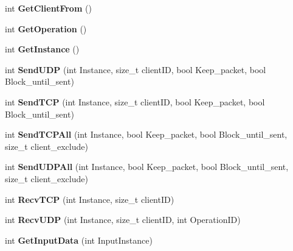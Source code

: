 \begin{DoxyCompactItemize}
\item 
\hypertarget{classcl_packet_ad8a08265ce5cf09f0228070be21f8744}{
int {\bfseries GetClientFrom} ()}
\label{classcl_packet_ad8a08265ce5cf09f0228070be21f8744}

\item 
\hypertarget{classcl_packet_a50a7c898447b5a5ca8bc14be17bae29f}{
int {\bfseries GetOperation} ()}
\label{classcl_packet_a50a7c898447b5a5ca8bc14be17bae29f}

\item 
\hypertarget{classcl_packet_a4d0d2655dc0739e54f983d9ecf58a874}{
int {\bfseries GetInstance} ()}
\label{classcl_packet_a4d0d2655dc0739e54f983d9ecf58a874}

\item 
\hypertarget{classcl_packet_a64034d51f45edee64c63805557440548}{
int {\bfseries SendUDP} (int Instance, size\_\-t clientID, bool Keep\_\-packet, bool Block\_\-until\_\-sent)}
\label{classcl_packet_a64034d51f45edee64c63805557440548}

\item 
\hypertarget{classcl_packet_ab41318551bd4bd28c51defd2c2616e62}{
int {\bfseries SendTCP} (int Instance, size\_\-t clientID, bool Keep\_\-packet, bool Block\_\-until\_\-sent)}
\label{classcl_packet_ab41318551bd4bd28c51defd2c2616e62}

\item 
\hypertarget{classcl_packet_ac30e73d8faa13087eaff1f864be1eb95}{
int {\bfseries SendTCPAll} (int Instance, bool Keep\_\-packet, bool Block\_\-until\_\-sent, size\_\-t client\_\-exclude)}
\label{classcl_packet_ac30e73d8faa13087eaff1f864be1eb95}

\item 
\hypertarget{classcl_packet_a866ff31b2a8185ae389721a3ab8ba9fc}{
int {\bfseries SendUDPAll} (int Instance, bool Keep\_\-packet, bool Block\_\-until\_\-sent, size\_\-t client\_\-exclude)}
\label{classcl_packet_a866ff31b2a8185ae389721a3ab8ba9fc}

\item 
\hypertarget{classcl_packet_a0f5a7d5a1da1917608ace018b815af81}{
int {\bfseries RecvTCP} (int Instance, size\_\-t clientID)}
\label{classcl_packet_a0f5a7d5a1da1917608ace018b815af81}

\item 
\hypertarget{classcl_packet_a7ba9cba116945bb89e51041275a93796}{
int {\bfseries RecvUDP} (int Instance, size\_\-t clientID, int OperationID)}
\label{classcl_packet_a7ba9cba116945bb89e51041275a93796}

\item 
\hypertarget{classcl_packet_aeb70011a4455e0d09f89865abba7133f}{
int {\bfseries GetInputData} (int InputInstance)}
\label{classcl_packet_aeb70011a4455e0d09f89865abba7133f}


\end{DoxyCompactItemize}
